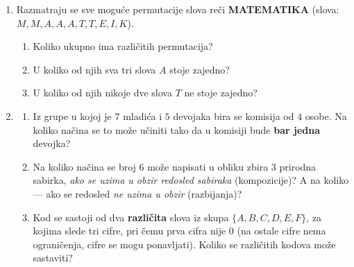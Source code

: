 \begin{enumerate}[label=\arabic*.]
\item Razmatraju se sve moguće permutacije slova reči \textbf{MATEMATIKA} (slova: $M,M,A,A,A,T,T,E,I,K$).
\begin{enumerate}[label=\alph*)]
\item Koliko ukupno ima različitih permutacija?
\item U koliko od njih sva tri slova $A$ stoje zajedno?
\item U koliko od njih nikoje dve slova $T$ ne stoje zajedno?
\end{enumerate}

\item \begin{enumerate}[label=\alph*)]
\item Iz grupe u kojoj je $7$ mladića i $5$ devojaka bira se komisija od $4$ osobe. Na koliko načina se to može učiniti tako da u komisiji bude \textbf{bar jedna} devojka?
\item Na koliko načina se broj $6$ može napisati u obliku zbira $3$ prirodna sabirka, \emph{ako se uzima u obzir redosled sabiraka} (kompozicije)? A na koliko — ako se redosled \emph{ne uzima u obzir} (razbijanja)?
\item Kod se sastoji od dva \textbf{različita} slova iz skupa $\{A,B,C,D,E,F\}$, za kojima slede tri cifre, pri čemu prva cifra nije $0$ (na ostale cifre nema ograničenja, cifre se mogu ponavljati). Koliko se različitih kodova može sastaviti?
\end{enumerate}
\end{enumerate}


